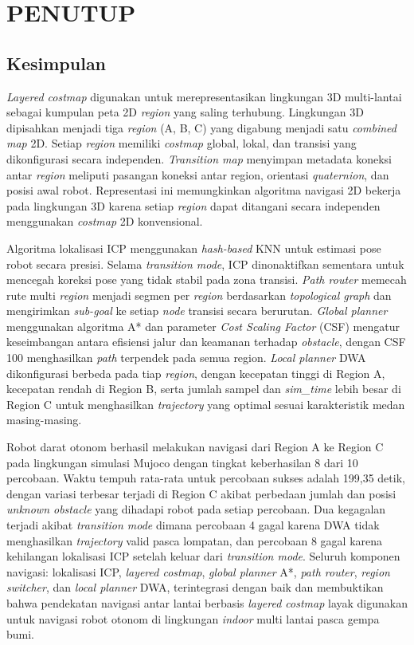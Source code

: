 \chapter{PENUTUP}
\label{chap:penutup}


\section{Kesimpulan}
\label{sec:kesimpulan}

\emph{Layered costmap} digunakan untuk merepresentasikan lingkungan 3D multi-lantai
sebagai kumpulan peta 2D \emph{region} yang saling terhubung. Lingkungan 3D dipisahkan
menjadi tiga \emph{region} (A, B, C) yang digabung menjadi satu \emph{combined map} 2D.
Setiap \emph{region} memiliki \emph{costmap} global, lokal, dan transisi yang
dikonfigurasi secara independen. \emph{Transition map} menyimpan metadata koneksi antar
\emph{region} meliputi pasangan koneksi antar region, orientasi \emph{quaternion}, dan posisi awal
robot. Representasi ini
memungkinkan algoritma navigasi 2D bekerja pada lingkungan 3D karena setiap \emph{region}
dapat ditangani secara independen menggunakan \emph{costmap} 2D konvensional.

Algoritma lokalisasi ICP menggunakan \emph{hash-based} KNN untuk estimasi pose robot secara
presisi. Selama \emph{transition mode}, ICP dinonaktifkan sementara untuk mencegah
koreksi pose yang tidak stabil pada zona transisi. \emph{Path router} memecah rute
multi \emph{region} menjadi segmen per \emph{region} berdasarkan \emph{topological
graph} dan mengirimkan \emph{sub-goal} ke setiap \emph{node} transisi secara berurutan.
\emph{Global planner} menggunakan algoritma A* dan parameter
\emph{Cost Scaling Factor} (CSF) mengatur keseimbangan antara efisiensi jalur dan
keamanan terhadap \emph{obstacle}, dengan CSF 100 menghasilkan \emph{path} terpendek
pada semua region. \emph{Local planner} DWA dikonfigurasi berbeda pada tiap
\emph{region}, dengan kecepatan tinggi di Region A, kecepatan rendah di Region B, serta
jumlah sampel dan \emph{sim\_time} lebih besar di Region C untuk menghasilkan
\emph{trajectory} yang optimal sesuai karakteristik medan masing-masing.

Robot darat otonom berhasil melakukan navigasi dari Region A ke Region C pada
lingkungan simulasi Mujoco dengan tingkat keberhasilan 8 dari 10 percobaan. Waktu
tempuh rata-rata untuk percobaan sukses adalah 199,35 detik, dengan variasi terbesar
terjadi di Region C akibat perbedaan jumlah dan posisi \emph{unknown obstacle} yang
dihadapi robot pada setiap percobaan. Dua kegagalan terjadi akibat \emph{transition mode} dimana percobaan 4 gagal karena DWA tidak menghasilkan
\emph{trajectory} valid pasca lompatan, dan percobaan 8 gagal karena kehilangan
lokalisasi ICP setelah keluar dari \emph{transition mode}. Seluruh komponen navigasi: lokalisasi ICP, \emph{layered costmap}, \emph{global planner} A*, \emph{path
router}, \emph{region switcher}, dan \emph{local planner} DWA, terintegrasi dengan
baik dan membuktikan bahwa pendekatan navigasi antar lantai berbasis \emph{layered
costmap} layak digunakan untuk navigasi robot otonom di lingkungan \emph{indoor}
multi lantai pasca gempa bumi.

